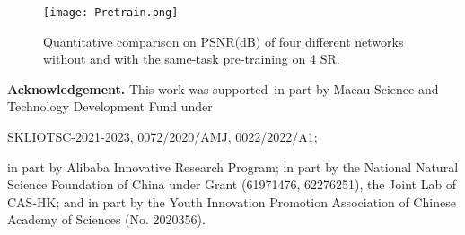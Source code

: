 \documentclass[10pt,twocolumn,letterpaper]{article}
\begin{document}
\begin{table}[!t]
\center
\begin{center}
\caption{Quantitative results on PSNR(dB) of HAT using two kinds of pre-training strategies on 4 SR under the same training setting. The full ImageNet dataset is adopted to perform pre-training and DF2K dataset is used for fine-tuning.}
\vspace{-0.2cm}
\label{pretrain1}
\end{center}
\end{table}

\begin{figure}[!t]
\begin{center}
\texttt{[image: Pretrain.png]}
\end{center}
\vspace{-0.4cm}
\caption{Quantitative comparison on PSNR(dB) of four different networks without and with the same-task pre-training on 4 SR.}
\label{pretrain2}
\vspace{-0.5cm}
\end{figure}

\noindent\textbf{Acknowledgement.} This work was supported in part by Macau Science and Technology Development Fund under 

\noindent SKLIOTSC-2021-2023, 0072/2020/AMJ, 0022/2022/A1; 

\noindent in part by Alibaba Innovative Research Program; in part by the National Natural Science Foundation of China under Grant (61971476, 62276251), the Joint Lab of CAS-HK; and in part by the Youth Innovation Promotion Association of Chinese Academy of Sciences (No. 2020356).

{\small


}

\newpage
\clearpage
\appendix
\end{document}

